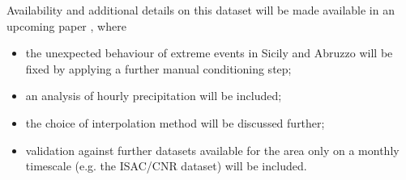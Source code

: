 Availability and additional details on this dataset will be made available in an upcoming paper \citep[][in preparation]{Fantini2018a}, where
\begin{itemize}
    \item the unexpected behaviour of extreme events in Sicily and Abruzzo will be fixed by applying a further manual conditioning step;
    \item an analysis of hourly precipitation will be included;
    \item the choice of interpolation method will be discussed further;
    \item validation against further datasets available for the area only on a monthly timescale (e.g. the ISAC/CNR dataset) will be included.
\end{itemize}
